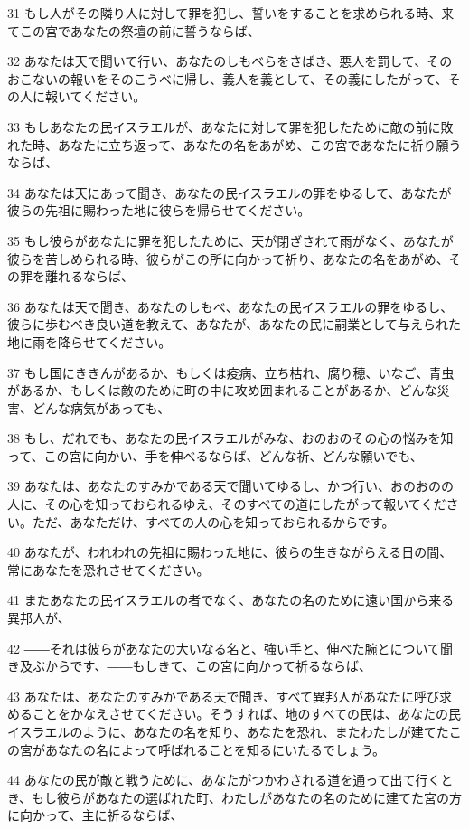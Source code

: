\par 31 もし人がその隣り人に対して罪を犯し、誓いをすることを求められる時、来てこの宮であなたの祭壇の前に誓うならば、
\par 32 あなたは天で聞いて行い、あなたのしもべらをさばき、悪人を罰して、そのおこないの報いをそのこうべに帰し、義人を義として、その義にしたがって、その人に報いてください。
\par 33 もしあなたの民イスラエルが、あなたに対して罪を犯したために敵の前に敗れた時、あなたに立ち返って、あなたの名をあがめ、この宮であなたに祈り願うならば、
\par 34 あなたは天にあって聞き、あなたの民イスラエルの罪をゆるして、あなたが彼らの先祖に賜わった地に彼らを帰らせてください。
\par 35 もし彼らがあなたに罪を犯したために、天が閉ざされて雨がなく、あなたが彼らを苦しめられる時、彼らがこの所に向かって祈り、あなたの名をあがめ、その罪を離れるならば、
\par 36 あなたは天で聞き、あなたのしもべ、あなたの民イスラエルの罪をゆるし、彼らに歩むべき良い道を教えて、あなたが、あなたの民に嗣業として与えられた地に雨を降らせてください。
\par 37 もし国にききんがあるか、もしくは疫病、立ち枯れ、腐り穂、いなご、青虫があるか、もしくは敵のために町の中に攻め囲まれることがあるか、どんな災害、どんな病気があっても、
\par 38 もし、だれでも、あなたの民イスラエルがみな、おのおのその心の悩みを知って、この宮に向かい、手を伸べるならば、どんな祈、どんな願いでも、
\par 39 あなたは、あなたのすみかである天で聞いてゆるし、かつ行い、おのおのの人に、その心を知っておられるゆえ、そのすべての道にしたがって報いてください。ただ、あなただけ、すべての人の心を知っておられるからです。
\par 40 あなたが、われわれの先祖に賜わった地に、彼らの生きながらえる日の間、常にあなたを恐れさせてください。
\par 41 またあなたの民イスラエルの者でなく、あなたの名のために遠い国から来る異邦人が、
\par 42 ――それは彼らがあなたの大いなる名と、強い手と、伸べた腕とについて聞き及ぶからです、――もしきて、この宮に向かって祈るならば、
\par 43 あなたは、あなたのすみかである天で聞き、すべて異邦人があなたに呼び求めることをかなえさせてください。そうすれば、地のすべての民は、あなたの民イスラエルのように、あなたの名を知り、あなたを恐れ、またわたしが建てたこの宮があなたの名によって呼ばれることを知るにいたるでしょう。
\par 44 あなたの民が敵と戦うために、あなたがつかわされる道を通って出て行くとき、もし彼らがあなたの選ばれた町、わたしがあなたの名のために建てた宮の方に向かって、主に祈るならば、
